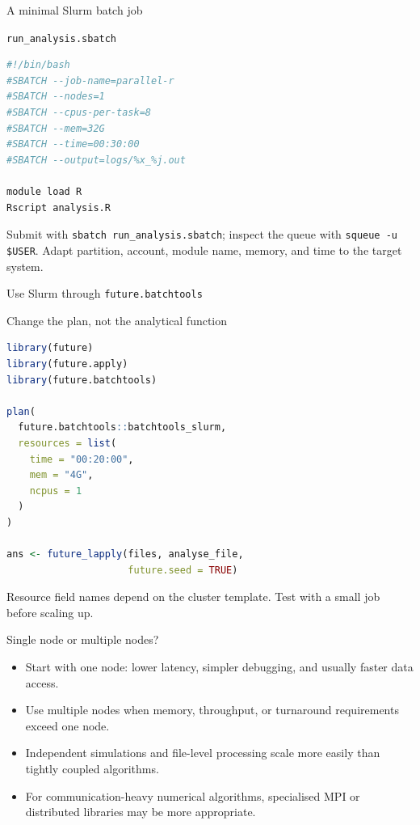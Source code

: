 \begin{frame}[fragile]{A minimal Slurm batch job}
\begin{block}{\texttt{run\_analysis.sbatch}}
\begin{lstlisting}[language=bash]
#!/bin/bash
#SBATCH --job-name=parallel-r
#SBATCH --nodes=1
#SBATCH --cpus-per-task=8
#SBATCH --mem=32G
#SBATCH --time=00:30:00
#SBATCH --output=logs/%x_%j.out

module load R
Rscript analysis.R
\end{lstlisting}
\end{block}
Submit with \texttt{sbatch run\_analysis.sbatch}; inspect the queue with \texttt{squeue -u \$USER}.
Adapt partition, account, module name, memory, and time to the target system.
\end{frame}

\begin{frame}[fragile]{Use Slurm through \texttt{future.batchtools}}
\begin{block}{Change the plan, not the analytical function}
\begin{lstlisting}[language=R]
library(future)
library(future.apply)
library(future.batchtools)

plan(
  future.batchtools::batchtools_slurm,
  resources = list(
    time = "00:20:00",
    mem = "4G",
    ncpus = 1
  )
)

ans <- future_lapply(files, analyse_file,
                     future.seed = TRUE)
\end{lstlisting}
\end{block}
Resource field names depend on the cluster template. Test with a small job before scaling up.
\end{frame}

\begin{frame}{Single node or multiple nodes?}
\begin{itemize}
  \item Start with one node: lower latency, simpler debugging, and usually faster data access.
  \item Use multiple nodes when memory, throughput, or turnaround requirements exceed one node.
  \item Independent simulations and file-level processing scale more easily than tightly coupled algorithms.
  \item For communication-heavy numerical algorithms, specialised MPI or distributed libraries may be more appropriate.
\end{itemize}
\end{frame}

